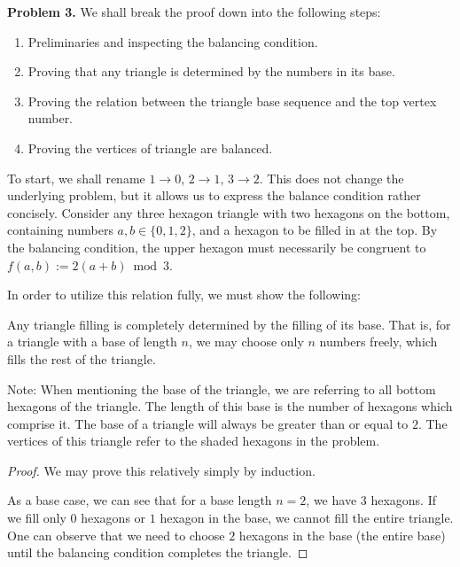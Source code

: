 \begin{solution}{3}
    \textbf{Problem 3.} We shall break the proof down into the following steps:
    \begin{enumerate}
        \item Preliminaries and inspecting the balancing condition.
        \item Proving that any triangle is determined by the numbers in its base.
        \item Proving the relation between the triangle base sequence and the top vertex number.
        \item Proving the vertices of triangle are balanced.
    \end{enumerate}

    To start, we shall rename \( 1 \to 0 \), \( 2 \to 1 \), \( 3 \to 2 \). This
    does not change the underlying problem, but it allows us to express the
    balance condition rather concisely. Consider any three hexagon triangle
    with two hexagons on the bottom, containing numbers \( a, b \in \{ 0, 1, 2 \} \),
    and a hexagon to be filled in at the top. By the balancing condition, the
    upper hexagon must necessarily be congruent to \( f(a, b) := 2(a + b) \bmod 3 \).

    In order to utilize this relation fully, we must show the following:
    \begin{claim}
        Any triangle filling is completely determined by the filling of its
        base. That is, for a triangle with a base of length \( n \), we may
        choose only \( n \) numbers freely, which fills the rest of the triangle.
    \end{claim}
    Note: When mentioning the base of the triangle, we are referring to all
    bottom hexagons of the triangle. The length of this base is the number of
    hexagons which comprise it. The base of a triangle will always be greater
    than or equal to \( 2 \). The vertices of this triangle refer to the shaded
    hexagons in the problem.
    \begin{proof}
        We may prove this relatively simply by induction.

        As a base case, we can see that for a base length \( n = 2 \), we have
        \( 3 \) hexagons. If we fill only \( 0 \) hexagons or \( 1 \) hexagon
        in the base, we cannot fill the entire triangle. One can observe that
        we need to choose \( 2 \) hexagons in the base (the entire base) until
        the balancing condition completes the triangle.


\end{proof}
\end{solution}
